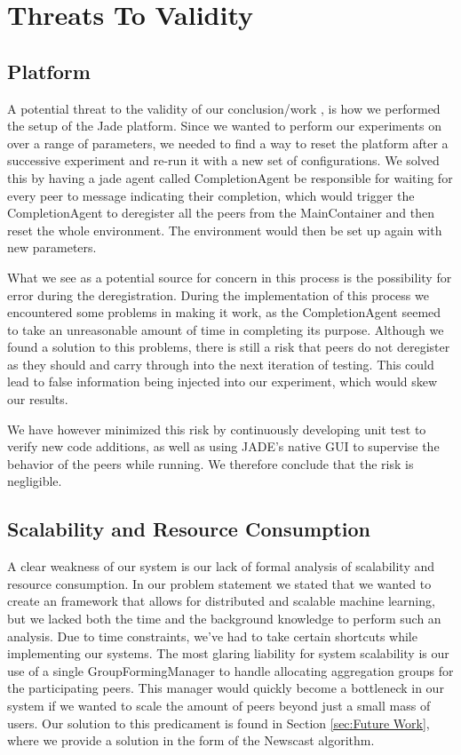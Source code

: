 \section{Threats To Validity}

\subsection{Platform}
A potential threat to the validity of our conclusion/work , is how we performed the setup of the Jade platform. Since we wanted to perform our experiments on over a range of parameters, we needed to find a way to reset the platform after a successive experiment and re-run it with a new set of configurations. We solved this by having a jade agent called CompletionAgent be responsible for waiting for every peer to message indicating their completion, which would trigger the CompletionAgent to deregister all the peers from the MainContainer and then reset the whole environment. The environment would then be set up again with new parameters. 

What we see as a potential source for concern in this process is the possibility for error during the deregistration. During the implementation of this process we encountered some problems in making it work, as the CompletionAgent seemed to take an unreasonable amount of time in completing its purpose. Although we found a solution to this problems, there is still a risk that peers do not deregister as they should and carry through into the next iteration of testing. This could lead to false information being injected into our experiment, which would skew our results.  

We have however minimized this risk by continuously developing unit test to verify new code additions, as well as using JADE's native GUI to supervise the behavior of the peers while running. We therefore conclude that the risk is negligible.

\subsection{Scalability and Resource Consumption}
A clear weakness of our system is our lack of formal analysis of scalability and resource consumption. In our problem statement we stated that we wanted to create an framework that allows for distributed and scalable machine learning, but we lacked both the time and the background knowledge to perform such an analysis. Due to time constraints, we've had to take certain shortcuts while implementing our systems. The most glaring liability for system scalability is our use of a single GroupFormingManager to handle allocating aggregation groups for the participating peers. This manager would quickly become a bottleneck in our system if we wanted to scale the amount of peers beyond just a small mass of users. Our solution to this predicament is found in Section \ref{sec:Future Work}, where we provide a solution in the form of the Newscast algorithm. 

